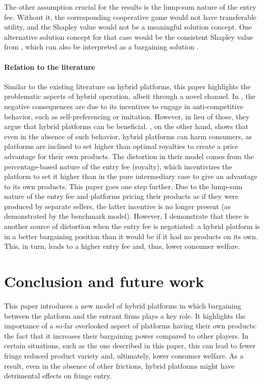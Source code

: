 The other assumption crucial for the results is the lump-sum nature of the entry fee.
Without it, the corresponding cooperative game would not have transferable utility, and the Shapley value would not be a meaningful solution concept.
One alternative solution concept for that case would be the consistent Shapley value from \textcite{maschler1992consistent}, which can also be interpreted as a bargaining solution \parencite{hart1996bargaining}.

\paragraph{Relation to the literature}
Similar to the existing literature on hybrid platforms, this paper highlights the problematic aspects of hybrid operation, albeit through a novel channel.
In \textcite{hagiu2022should}, the negative consequences are due to its incentives to engage in anti-competitive behavior, such as self-preferencing or imitation.
However, in lieu of those, they argue that hybrid platforms can be beneficial.
\textcite{anderson2021hybrid}, on the other hand, shows that even in the absence of such behavior, hybrid platforms can harm consumers, as platforms are inclined to set higher than optimal royalties to create a price advantage for their own products.
The distortion in their model comes from the percentage-based nature of the entry fee (royalty), which incentivizes the platform to set it higher than in the pure intermediary case to give an advantage to its own products.
This paper goes one step further.
Due to the lump-sum nature of the entry fee and platforms pricing their products as if they were produced by separate sellers, the latter incentive is no longer present (as demonstrated by the benchmark model).
However, I demonstrate that there is another source of distortion when the entry fee is negotiated: a hybrid platform is in a better bargaining position than it would be if it had no products on its own.
This, in turn, leads to a higher entry fee and, thus, lower consumer welfare.

\section{Conclusion and future work}
\label{sec:conclusion}

This paper introduces a new model of hybrid platforms in which bargaining between the platform and the entrant firms plays a key role.
It highlights the importance of a so-far overlooked aspect of platforms having their own products: the fact that it increases their bargaining power compared to other players.
In certain situations, such as the one described in this paper, this can lead to fewer fringe reduced product variety and, ultimately, lower consumer welfare.
As a result, even in the absence of other frictions, hybrid platforms might have detrimental effects on fringe entry.

